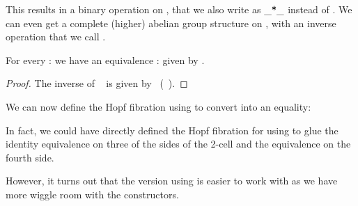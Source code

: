 This results in a binary operation on , that we also write
as \( \_\func{*}\_ \) instead of . We can even get a
complete (higher) abelian group structure on , with an
inverse operation that we call .
%
\begin{lemma}

  For every  :  we have an equivalence 
   :    given by  .
\end{lemma}
\begin{proof}
  The inverse of ~ is given by ~(~).
\end{proof}

We can now define the Hopf fibration using  to convert  into
an equality:
%

In fact, we could have directly defined the Hopf fibration for
 using  to glue the identity equivalence on three of the sides
of the 2-cell and the  equivalence on the fourth side.
%

However, it turns out that the version using   is
easier to work with as we have more wiggle room with the
constructors.

